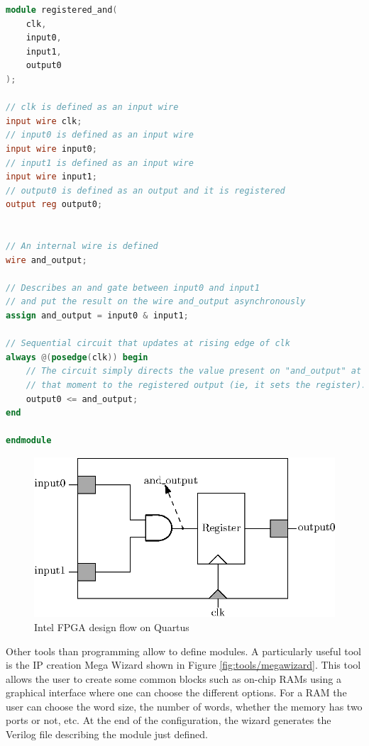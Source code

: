 \begin{lstlisting}[language=Verilog, caption=Verilog Registered AND gate example]
module registered_and(
    clk,
    input0,
    input1,
    output0
);

// clk is defined as an input wire 
input wire clk;   
// input0 is defined as an input wire  
input wire input0;  
// input1 is defined as an input wire
input wire input1; 
// output0 is defined as an output and it is registered
output reg output0; 


// An internal wire is defined
wire and_output;    

// Describes an and gate between input0 and input1
// and put the result on the wire and_output asynchronously
assign and_output = input0 & input1; 

// Sequential circuit that updates at rising edge of clk
always @(posedge(clk)) begin
    // The circuit simply directs the value present on "and_output" at 
    // that moment to the registered output (ie, it sets the register).
    output0 <= and_output;                      
end

endmodule

\end{lstlisting}

\begin{figure}[H]
    \centering
    \includegraphics[scale=1.0]{Chapter2-FPGA_Flow/res/register_and}
    \caption{Intel FPGA design flow on Quartus}
    \label{fig:verilog/register_and}
\end{figure}

Other tools than programming allow to define modules. A particularly useful tool is the IP creation 
Mega Wizard shown in Figure \ref{fig:tools/megawizard}. This tool allows the user to create some common 
blocks such as on-chip RAMs using a graphical interface where one can choose the different options. 
For a RAM the user can choose the word size, the number of words, whether the memory has 
two ports or not, etc. At the end of the configuration, the wizard generates the Verilog file 
describing the module just defined.

